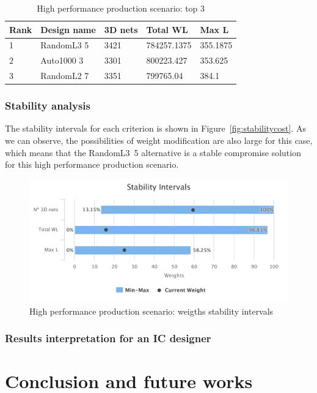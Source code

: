 \documentclass{svmult}
\begin{document}
\begin{table}[h!]
    \begin{center}
        \caption{High performance production scenario: top 3}
        \label{tab:top3perf}
        \begin{tabular}{p{1.2cm}p{2.3cm}p{1.5cm}p{2cm}p{1.3cm}}
            \hline
            Rank & Design name & 3D nets & Total WL & Max L\\
            \hline
            1 & RandomL3 5 & 3421 & 784257.1375 & 355.1875 \\
            2 & Auto1000 3 & 3301 & 800223.427 & 353.625 \\
            3 & RandomL2 7 & 3351 & 799765.04 & 384.1 \\
            \hline
        \end{tabular}
    \end{center}
\end{table}

\subsubsection*{Stability analysis}
The stability intervals for each criterion is shown in Figure~\ref{fig:stabilitycost}. As we can observe, the possibilities of weight modification are also large for this case, which means that the RandomL3~5 alternative is a stable compromise solution for this high performance production scenario.

\begin{figure}[h!]
    \centering
    \includegraphics[width=\linewidth]{stabilityperf}
    \caption{High performance production scenario: weigths stability intervals}
    \label{fig:stabilityperf}
\end{figure}

\subsubsection{Results interpretation for an IC designer}


\section{Conclusion and future works}




\end{document}
